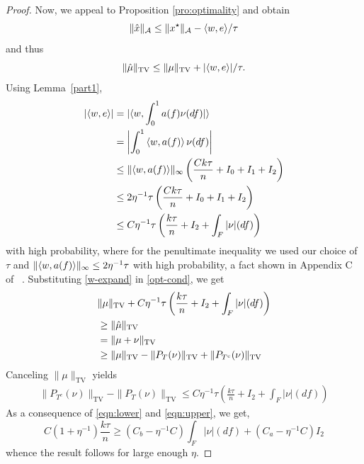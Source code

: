 \begin{proof}
Now, we appeal to Proposition \ref{pro:optimality} and obtain
\[
\lVert\hat{x}\rVert_{\mathcal{A}} \leq \lVert x^\star\rVert_{\mathcal{A}} - \langle w, e \rangle/\tau
\]
and thus
\begin{equation}
\label{opt-cond}
\lVert\hat{\mu}\rVert_{\mathrm{TV}} \leq \lVert\mu\rVert_{\mathrm{TV}} + |\langle w, e \rangle|/\tau.
\end{equation}
Using Lemma~\ref{part1},
\begin{align}
\nonumber |\langle w, e \rangle| & = |\langle w, \int_0^1 a(f) \nu(df)  |\rangle\\
& = \left|\int_0^1  \left\langle w,  a(f)  \right\rangle \nu(df)\right|\\
\nonumber & \leq \lVert\left\langle w,  a(f)  \right\rangle\rVert_\infty\left(\frac{C k \tau}{n} + I_0 + I_1 + I_2\right)\\
\label{w-expand}& \leq 2\eta^{-1} \tau \left(\frac{C k \tau}{n} + I_0 + I_1 + I_2\right)\nonumber \\
 & \leq C \eta^{-1} \tau \left(\frac{k\tau}{n} + I_2 + \int_F |\nu|(df) \right)
\end{align}
with high probability, where for the penultimate inequality we used our choice of $\tau$ and $\lVert\left\langle w,  a(f)  \right\rangle\rVert_\infty \leq 2\eta^{-1} \tau$ with high probability, a fact shown in Appendix C of ~\cite{btr12}. 
Substituting \eqref{w-expand} in \eqref{opt-cond}, we get
\begin{align*}
& \lVert\mu\rVert_{\mathrm{TV}} + C \eta^{-1} \tau \left(\frac{k\tau}{n} + I_2 + \int_F |\nu|(df) \right)\\
& \geq \lVert\hat{\mu}\rVert_{\mathrm{TV}}\\
& = \lVert\mu + \nu\rVert_{\mathrm{TV}}\\
& \geq \lVert\mu\rVert_{\mathrm{TV}} - \lVert{P_T(\nu)}\rVert_{\mathrm{TV}} + \lVert{P_{T^c}(\nu)}\rVert_{\mathrm{TV}}\end{align*}
Canceling $\|\mu\|_{\mathrm{TV}}$ yields 
\begin{align}\label{eqn:upper}
\|P_{T^c}(\nu)\|_{\mathrm{TV}} - \|P_T(\nu)\|_{\mathrm{TV}} \leq C\eta^{-1}\tau \left(\frac{k \tau}{n} + I_2 + \int_F |\nu|(df)\right)
\end{align}
As a consequence of \eqref{eqn:lower} and \eqref{eqn:upper}, we get,
\[
  C(1+\eta^{-1}) \frac{k \tau}{n} \geq  ( C_b - \eta^{-1} C)  \int_F{|\nu|(df)} + ( C_a - \eta^{-1} C)I_2
\]
whence the result follows for large enough $\eta.$
\end{proof}

